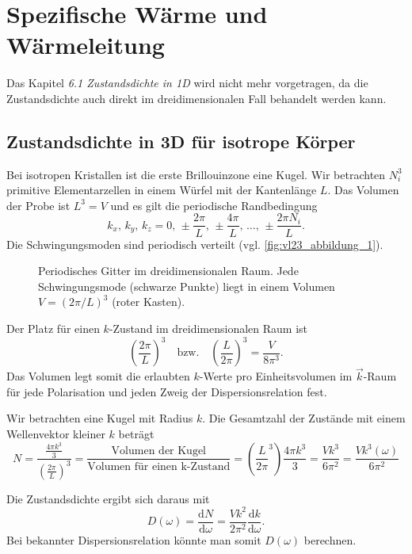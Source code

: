 \setcounter{section}{5}

\section{Spezifische Wärme und Wärmeleitung}
	\label{sec:waermeleitung}
	\begin{verbal}
		Das Kapitel \textit{6.1 Zustandsdichte in 1D} wird nicht mehr vorgetragen, da die Zustandsdichte auch direkt im dreidimensionalen Fall behandelt werden kann.
	\end{verbal}

\subsection{Zustandsdichte in 3D für isotrope Körper}
	Bei isotropen Kristallen ist die erste Brillouinzone eine Kugel.
	Wir betrachten $N_{i}^3$ primitive Elementarzellen in einem Würfel mit der Kantenlänge $L$. Das Volumen der Probe ist $L^3 = V$ und es gilt die periodische Randbedingung  
	$$
	k_{x},\, k_{y},\, k_{z} = 0, \, \pm \frac{2\pi}{L}, \, \pm \frac{4\pi}{L}, \, \ldots,\, \pm \frac{2\pi N_{i}}{L}.
	$$
	Die Schwingungsmoden sind periodisch verteilt (vgl. \autoref{fig:vl23_abbildung_1}).

	\begin{figure}[H]
		\centering
		\caption{Periodisches Gitter im dreidimensionalen Raum. Jede Schwingungsmode (schwarze Punkte) liegt in einem Volumen $V=(2\pi/L)^3$ (roter Kasten).}
		\label{fig:vl23_abbildung_1}
	\end{figure}

	Der Platz für einen $k$-Zustand im dreidimensionalen Raum ist
	$$
	\left( \frac{2\pi}{L} \right) ^3 \quad \text{bzw.} \quad
	\left( \frac{L}{2\pi} \right) ^3 = \frac{V}{8\pi^3}.
	$$ 
	Das Volumen legt somit die erlaubten $k$-Werte pro Einheitsvolumen im $\Vec{k}$-Raum für jede Polarisation und jeden Zweig der Dispersionsrelation fest.

	Wir betrachten eine Kugel mit Radius $k$. Die Gesamtzahl der Zustände mit einem Wellenvektor kleiner $k$ beträgt
	$$
	N = \frac{\frac{4\pi k^3}{3}}{\left( \frac{2\pi}{L} \right) ^3} = \frac{\text{Volumen der Kugel}}{\text{Volumen für einen k-Zustand}} = \left( \frac{L}{2\pi}^3 \right) \frac{4\pi k^3}{3} = \frac{Vk^3}{6\pi^2} = \frac{Vk^3(\omega)}{6\pi^2}
	$$

	Die Zustandsdichte ergibt sich daraus mit
	\begin{equation}
		\label{eq:II.6.1}
		D(\omega) = \frac{\mathrm{d}N}{\mathrm{d}\omega} = \frac{Vk^2}{2\pi^2} \frac{\mathrm{d} k}{\mathrm{d}\omega}.
	\end{equation}
	Bei bekannter Dispersionsrelation könnte man somit $D(\omega)$ berechnen.

